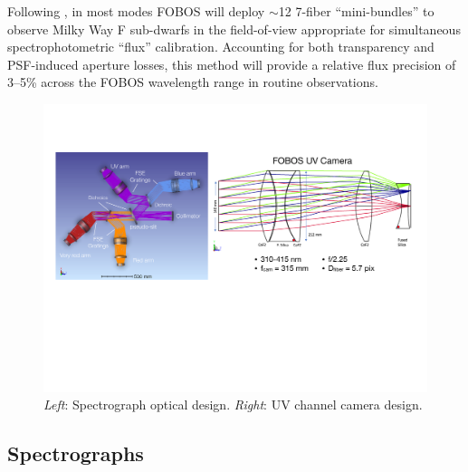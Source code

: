 \documentclass[oneside,11pt]{amsart}
\begin{document}

Following \citet{yan16}, in most modes FOBOS will deploy $\sim$12 7-fiber ``mini-bundles'' to observe Milky Way F sub-dwarfs in the field-of-view appropriate for simultaneous spectrophotometric ``flux'' calibration.  Accounting for both transparency and PSF-induced aperture losses, this method will provide a relative flux precision of 3--5\% across the FOBOS wavelength range in routine observations.

\begin{figure}[h!]
\vskip -0.1in
\includegraphics[width=\textwidth]{figs/Spec_and_UVcam_v1.pdf}
\caption{\small {\it Left}: Spectrograph optical design. {\it Right}: UV channel camera design.}
\label{fig:spec}
\end{figure}

\subsection{Spectrographs}
\end{document}
